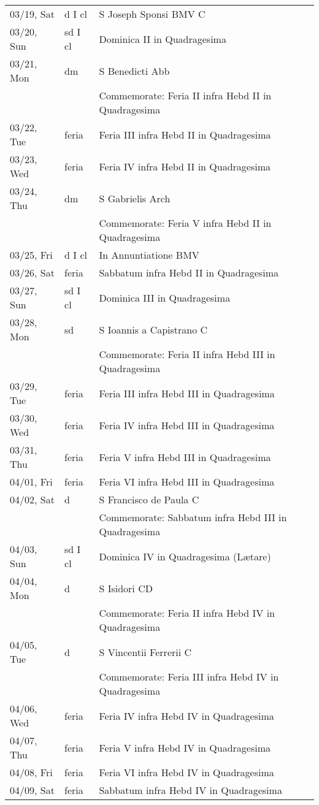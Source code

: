 \documentclass{article}
\begin{document}
\begin{longtable}{ l l l }
03/19, Sat & d I cl & S Joseph Sponsi BMV C\\
03/20, Sun & sd I cl & Dominica II in Quadragesima\\
03/21, Mon & dm & S Benedicti Abb\\
 & & Commemorate: Feria II infra Hebd II in Quadragesima\\
03/22, Tue & feria & Feria III infra Hebd II in Quadragesima\\
03/23, Wed & feria & Feria IV infra Hebd II in Quadragesima\\
03/24, Thu & dm & S Gabrielis Arch\\
 & & Commemorate: Feria V infra Hebd II in Quadragesima\\
03/25, Fri & d I cl & In Annuntiatione BMV\\
03/26, Sat & feria & Sabbatum infra Hebd II in Quadragesima\\
03/27, Sun & sd I cl & Dominica III in Quadragesima\\
03/28, Mon & sd & S Ioannis a Capistrano C\\
 & & Commemorate: Feria II infra Hebd III in Quadragesima\\
03/29, Tue & feria & Feria III infra Hebd III in Quadragesima\\
03/30, Wed & feria & Feria IV infra Hebd III in Quadragesima\\
03/31, Thu & feria & Feria V infra Hebd III in Quadragesima\\
04/01, Fri & feria & Feria VI infra Hebd III in Quadragesima\\
04/02, Sat & d & S Francisco de Paula C\\
 & & Commemorate: Sabbatum infra Hebd III in Quadragesima\\
04/03, Sun & sd I cl & Dominica IV in Quadragesima (Lætare)\\
04/04, Mon & d & S Isidori CD\\
 & & Commemorate: Feria II infra Hebd IV in Quadragesima \\
04/05, Tue & d & S Vincentii Ferrerii C\\
 & & Commemorate: Feria III infra Hebd IV in Quadragesima \\
04/06, Wed & feria & Feria IV infra Hebd IV in Quadragesima \\
04/07, Thu & feria & Feria V infra Hebd IV in Quadragesima \\
04/08, Fri & feria & Feria VI infra Hebd IV in Quadragesima \\
04/09, Sat & feria & Sabbatum infra Hebd IV in Quadragesima \\

\end{longtable}
\end{document}
